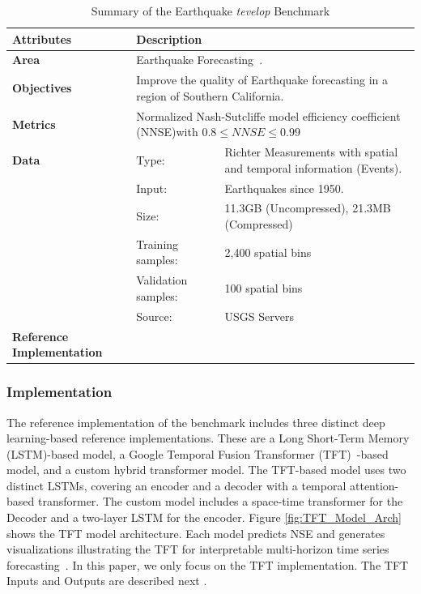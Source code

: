 \documentclass[utf8]{FrontiersinVancouver} %
\begin{document}
\begin{table}
\caption{Summary of the Earthquake {\em tevelop} Benchmark}\label{tab:eq-summary}
\begin{center}
  {\footnotesize
\begin{tabular}{|p{}p{}p{}|}
\hline
{\bf Attributes} & {\bf Description} \\
\hline
\hline
{\bf Area} & \multicolumn{2}{l|}{Earthquake Forecasting~\citep{fox2022-jm,TFT-21,eq-code,eq-data}.}\\
\hline
{\bf Objectives} &  \multicolumn{2}{l|}{Improve the quality of Earthquake
forecasting in a region of Southern California.}\\
\hline
{\bf Metrics} & \multicolumn{2}{l|}{Normalized Nash-Sutcliffe model efficiency coefficient (NNSE)with $0.8\leq NNSE\leq 0.99$}\\
\hline
{\bf Data}  & Type:  & Richter Measurements with spatial and temporal information (Events). \\
  &  Input:  & Earthquakes since 1950.\\
  &  Size:  & 11.3GB (Uncompressed), 21.3MB (Compressed)\\
  & Training samples: & 2,400 spatial bins\\
  & Validation samples:  &  100 spatial bins\\
  & Source:  & USGS Servers~\citep{eq-data}\\
\hline
{\bf Reference Implementation} & \citep{eq-code} & \\
\hline
\end{tabular}
}
\end{center}
\end{table}


\subsubsection{Implementation}

The reference implementation of the benchmark includes three distinct
deep learning-based reference implementations. These are a Long
Short-Term Memory (LSTM)-based model, a Google Temporal Fusion
Transformer (TFT)~\citep{TFT-21}-based model, and a custom hybrid
transformer model. The TFT-based model uses two distinct LSTMs,
covering an encoder and a decoder with a temporal attention-based
transformer. The custom model includes a space-time transformer for
the Decoder and a two-layer LSTM for the encoder. Figure \ref{fig:TFT_Model_Arch} 
shows the TFT model architecture. Each model predicts
NSE and generates visualizations illustrating the TFT for
interpretable multi-horizon time series
forecasting~\citep{TFT-21}. In this paper, we only focus on
the TFT implementation. The TFT Inputs and Outputs are described next \cite{fox2022-jm}.  
\end{document}
